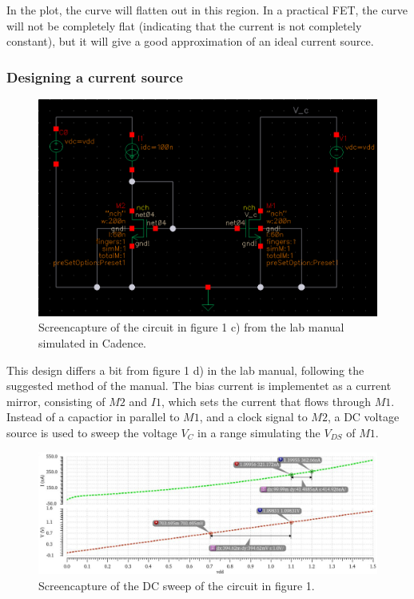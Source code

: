 \documentclass[onecolumn]{article}
\begin{document}
In the plot, the curve will flatten out in this region. In a practical FET, the curve will not be completely flat (indicating that the current is not completely constant), but it will give a good approximation of an ideal current source.


\subsubsection{Designing a current source}

\begin{figure}[h!]
    \centering
    \includegraphics[width=1\textwidth]{circuit_c_fixed.png}
    \caption{Screencapture of the circuit in figure 1 c) from the lab manual simulated in Cadence.}
    \label{fig:circuitc}
\end{figure}

\clearpage 

This design differs a bit from figure 1 d) in the lab manual, following the suggested method of the manual. The bias current is implementet as a current mirror, consisting of $M2$ and $I1$, which sets the current that flows through $M1$. Instead of a capactior in parallel to $M1$, and a clock signal to $M2$, a DC voltage source is used to sweep the voltage $V_C$ in a range simulating the $V_{DS}$ of $M1$. 



\begin{figure}[h!]
    \centering
    \includegraphics[width=1\textwidth]{plot_circuit_c_FINAL.png}
    \caption{Screencapture of the DC sweep of the circuit in figure 1.}
    \label{fig:plotc}
\end{figure}
\end{document}
